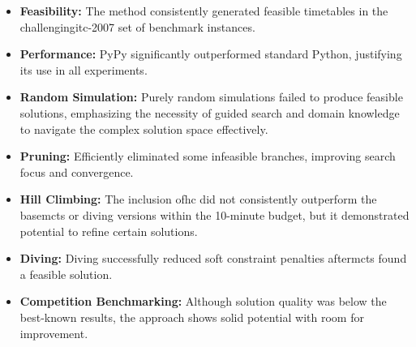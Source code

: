 \begin{itemize}
\item \textbf{Feasibility:} The method consistently generated feasible timetables in the challenging\ac{itc-2007} set of benchmark instances.

\item \textbf{Performance:} PyPy significantly outperformed standard Python, justifying its use in all experiments.

\item \textbf{Random Simulation:} Purely random simulations failed to produce feasible solutions, emphasizing the necessity of guided search and domain knowledge to navigate the complex solution space effectively.

\item \textbf{Pruning:} Efficiently eliminated some infeasible branches, improving search focus and convergence.

\item \textbf{Hill Climbing:} The inclusion of\ac{hc} did not consistently outperform the base\ac{mcts} or diving versions within the 10-minute budget, but it demonstrated potential to refine certain solutions.

\item \textbf{Diving:} Diving successfully reduced soft constraint penalties after\ac{mcts} found a feasible solution.

\item \textbf{Competition Benchmarking:} Although solution quality was below the best-known results, the approach shows solid potential with room for improvement.
\end{itemize}